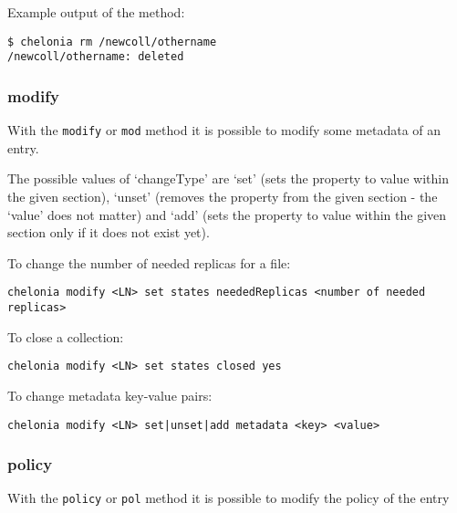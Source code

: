 Example output of the method:
\begin{verbatim}
$ chelonia rm /newcoll/othername
/newcoll/othername: deleted    
\end{verbatim}

\subsubsection{modify} %
\label{ssub:modify}

With the \texttt{modify} or \texttt{mod} method it is possible to modify some metadata of an entry.
\hspace*{0.5cm}
\begin{shaded}
\end{shaded}

The possible values of `changeType' are `set' (sets the property to value within the given section), `unset' (removes the property from the given section - the `value' does not matter) and `add' (sets the property to value within the given section only if it does not exist yet). 

To change the number of needed replicas for a file:
\begin{verbatim}
chelonia modify <LN> set states neededReplicas <number of needed replicas>    
\end{verbatim}

To close a collection:
\begin{verbatim}
chelonia modify <LN> set states closed yes    
\end{verbatim}

To change metadata key-value pairs:
\begin{verbatim}
chelonia modify <LN> set|unset|add metadata <key> <value>    
\end{verbatim}

\subsubsection{policy} %
\label{ssub:policy}

With the \texttt{policy} or \texttt{pol} method it is possible to modify the policy of the entry
\hspace*{0.5cm}
\begin{shaded}
\end{shaded}

